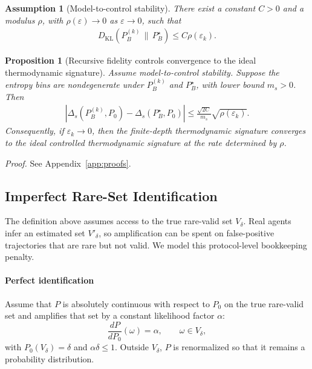 \documentclass[
  aps,
  prresearch,
  reprint,
  amsmath,
  amssymb,
  superscriptaddress,
  nofootinbib,
  longbibliography
]{revtex4-2}
\def\EQSP{3pt}
\newcommand{\cgather}[2][\EQSP]{\begingroup\setlength\abovedisplayskip{#1}\setlength\belowdisplayskip{#1}\begin{gather} #2 \end{gather}\endgroup\noindent}
\newtheorem{proposition}{Proposition}
\newtheorem{assumption}{Assumption}
\begin{document}
\begin{assumption}[Model-to-control stability]
\label{ass:model_to_control}
There exist a constant \(C>0\) and a modulus \(\rho\), with \(\rho(\varepsilon)\to0\) as \(\varepsilon\to0\), such that
\cgather{
    D_{\mathrm{KL}}
    \left(
    P_B^{(k)}\,\|\,P_B^\star
    \right)
    \leq
    C\rho(\varepsilon_k).
    \label{eq:model_to_control_stability}
}
\end{assumption}

\begin{proposition}[Recursive fidelity controls convergence to the ideal thermodynamic signature]
\label{prop:recursive_signature_convergence}
Assume model-to-control stability. Suppose the entropy bins are nondegenerate under \(P_B^{(k)}\) and \(P_B^\star\), with lower bound \(m_s>0\). Then
\cgather{
    \left|
    \Delta_s(P_B^{(k)},P_0)
    -
    \Delta_s(P_B^\star,P_0)
    \right|
    \leq
    \frac{\sqrt{2C}}{m_s}
    \sqrt{\rho(\varepsilon_k)}.
    \label{eq:recursive_signature_convergence}
}
Consequently, if \(\varepsilon_k\to0\), then the finite-depth thermodynamic signature converges to the ideal controlled thermodynamic signature at the rate determined by \(\rho\).
\end{proposition}
\noindent\emph{Proof.} See Appendix~\ref{app:proofs}.


\subsection{Imperfect Rare-Set Identification}
\label{sec:theorem2}
The definition above assumes access to the true rare-valid set \(V_\delta\). Real agents infer an estimated set \(V'_\delta\), so amplification can be spent on false-positive trajectories that are rare but not valid. We model this protocol-level bookkeeping penalty.

\paragraph{Perfect identification}

Assume that \(P\) is absolutely continuous with respect to \(P_0\) on the true rare-valid set and amplifies that set by a constant likelihood factor \(\alpha\):
\begin{equation}
\frac{dP}{dP_0}(\omega)=\alpha,
\qquad \omega\in V_\delta,
\end{equation}
with \(P_0(V_\delta)=\delta\) and \(\alpha\delta\le 1\). Outside \(V_\delta\), \(P\) is renormalized so that it remains a probability distribution.
\end{document}
